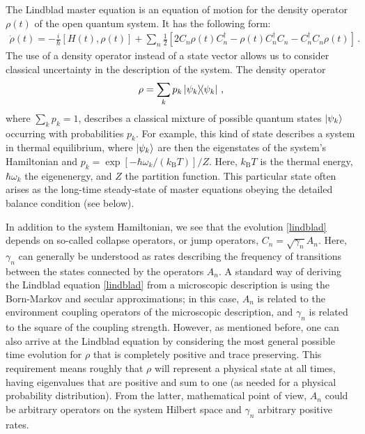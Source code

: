 \documentclass[preprint,3p,sort&compress]{elsarticle}
\begin{document}
The Lindblad master equation is an equation of motion for the density operator $\rho(t)$ of the open quantum system. It has the following form:
\begin{align} \label{lindblad}
\dot\rho(t) = -\frac{i}{\hbar}[H(t),\rho(t)] + \sum_n \frac{1}{2} \left[2 C_n \rho(t) C_n^\dagger - \rho(t) C_n^\dagger C_n - C_n^\dagger C_n \rho(t)\right] \, .
\end{align}
The use of a density operator instead of a state vector allows us to consider classical uncertainty in the description of the system. The density operator
\begin{equation}
\rho = \sum_k p_k \ketbra{\psi_k}{\psi_k} \, ,
\end{equation}
where $\sum_k p_k = 1$, describes a classical mixture of possible quantum states $\ket{\psi_k}$ occurring with probabilities $p_k$. For example, this kind of state describes a system in thermal equilibrium, where $\ket{\psi_k}$ are then the eigenstates of the system's Hamiltonian and $p_k=\exp[-\hbar \omega_k / (k_\mathrm{B} T)] / Z$. Here, $k_\mathrm{B} T$ is the thermal energy, $\hbar\omega_k$ the eigenenergy, and $Z$ the partition function.  This particular state often arises as the long-time steady-state of master equations obeying the detailed balance condition (see below). %

In addition to the system Hamiltonian, we see that the evolution \eqref{lindblad} depends on so-called collapse operators, or jump operators, $C_n=\sqrt{\gamma_n}A_n$.  Here, $\gamma_n$ can generally be understood as rates describing the frequency of transitions between the states connected by the operators $A_n$. A standard way of deriving the Lindblad equation \eqref{lindblad} from a microscopic description is using the Born-Markov and secular approximations; in this case, $A_n$ is related to the environment coupling operators of the microscopic description, and $\gamma_n$ is related to the square of the coupling strength. However, as mentioned before, one can also arrive at the Lindblad equation by considering the most general possible time evolution for $\rho$ that is completely positive and trace preserving. This requirement means roughly that $\rho$ will represent a physical state at all times, having eigenvalues that are positive and sum to one (as needed for a physical probability distribution). From the latter, mathematical point of view, $A_n$ could be arbitrary operators on the system Hilbert space and $\gamma_n$ arbitrary positive rates.
\end{document}
